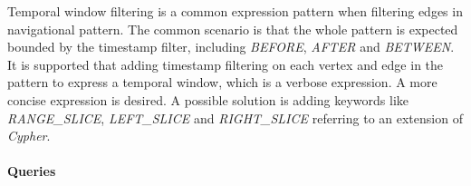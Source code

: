 
Temporal window filtering is a common expression pattern when filtering edges in
navigational pattern. The common scenario is that the whole pattern is expected
bounded by the timestamp filter, including \emph{BEFORE}, \emph{AFTER} and
\emph{BETWEEN}. It is supported that adding timestamp filtering on each vertex
and edge in the pattern to express a temporal window, which is a verbose
expression. A more concise expression is desired. A possible solution is adding
keywords like \emph{RANGE\_SLICE}, \emph{LEFT\_SLICE} and \emph{RIGHT\_SLICE}
referring to an extension of \emph{Cypher}\cite{tcypher}.


\paragraph{Queries}
{\raggedright
}